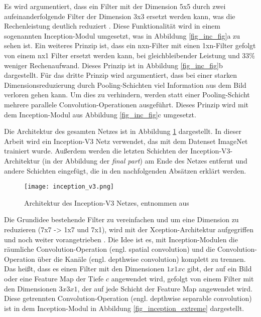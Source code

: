 Es wird argumentiert, dass ein Filter mit der Dimension 5x5 durch zwei aufeinanderfolgende Filter der Dimension 3x3 ersetzt werden kann, was die Rechenleistung deutlich reduziert \cite{szegedy2016inception}. Diese Funktionalität wird in einem sogenannten Inception-Modul umgesetzt, was in Abbildung \ref{fig_inc_fig}a zu sehen ist. Ein weiteres Prinzip ist, dass ein nxn-Filter mit einen 1xn-Filter gefolgt von einem nx1 Filter ersetzt werden kann, bei gleichbleibender Leistung und 33\% weniger Rechenaufwand. Dieses Prinzip ist in Abbildung \ref{fig_inc_fig}b dargestellt. Für das dritte Prinzip wird argumentiert, dass bei einer starken Dimensionsreduzierung durch Pooling-Schichten viel Information aus dem Bild verloren gehen kann. Um dies zu verhindern, werden statt einer Pooling-Schicht mehrere parallele Convolution-Operationen ausgeführt. Dieses Prinzip wird mit dem Inception-Modul aus Abbildung \ref{fig_inc_fig}c umgesetzt.

Die Architektur des gesamten Netzes ist in Abbildung \ref{fig_inception_v3} dargestellt. In dieser Arbeit wird ein Inception-V3 Netz verwendet, das mit dem Datenset ImageNet \cite{deng2009imagenet} trainiert wurde. Außerdem werden die letzten Schichten der Inception-V3-Architektur (in der Abbildung der \textit{final part}) am Ende des Netzes entfernt und andere Schichten eingefügt, die in den nachfolgenden Absätzen erklärt werden.

\begin{figure}[h]
\centering
\texttt{[image: inception\_v3.png]}
\caption{Architektur des Inception-V3 Netzes, entnommen aus \cite{google2018inceptionv3}}
\label{fig_inception_v3}
\end{figure}

Die Grundidee bestehende Filter zu vereinfachen und um eine Dimension zu reduzieren (7x7 -> 1x7 und 7x1), wird mit der Xception-Architektur aufgegriffen und noch weiter vorangetrieben \cite{chollet2017xception}. Die Idee ist es, mit Inception-Modulen die räumliche Convolution-Operation (engl. spatial convolution) und die Convolution-Operation über die Kanäle (engl. depthwise convolution) komplett zu trennen. Das heißt, dass es einen Filter mit den Dimensionen $1x1xc$ gibt, der auf ein Bild oder eine Feature Map der Tiefe $c$ angewendet wird, gefolgt von einem Filter mit den Dimensionen $3x3x1$, der auf jede Schicht der Feature Map angewendet wird. Diese getrennten Convolution-Operation (engl. depthwise separable convolution) ist in dem Inception-Modul in Abbildung \ref{fig_inception_extreme} dargestellt.

